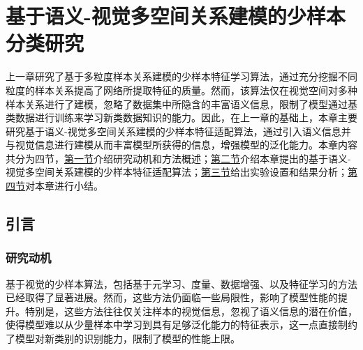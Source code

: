 \chapter[\hspace{0pt}基于语义-视觉多空间关系建模的少样本分类研究]{{\heiti{}\hspace{0pt}基于语义-视觉多空间关系建模的少样本分类研究}}\label{chapter4: 基于语义-视觉多空间关系建模的少样本分类研究}
\removelofgap
\removelotgap

上一章研究了基于多粒度样本关系建模的少样本特征学习算法，通过充分挖掘不同粒度的样本关系提高了网络所提取特征的质量。然而，该算法仅在视觉空间对多种样本关系进行了建模，忽略了数据集中所隐含的丰富语义信息，限制了模型通过基类数据进行训练来学习新类数据知识的能力。因此，在上一章的基础上，本章主要研究基于语义-视觉多空间关系建模的少样本特征适配算法，通过引入语义信息并与视觉信息进行建模从而丰富模型所获得的信息，增强模型的泛化能力。本章内容共分为四节，\hyperref[section4: 引言]{第一节}介绍研究动机和方法概述；\hyperref[section4: 基于语义-视觉多空间关系建模的少样本特征适配算法]{第二节}介绍本章提出的基于语义-视觉多空间关系建模的少样本特征适配算法；\hyperref[section4: 实验设置及结果分析]{第三节}给出实验设置和结果分析；\hyperref[section4: 本章小结]{第四节}对本章进行小结。

\section[\hspace{-2pt}引言]{{\heiti{} \hspace{-8pt}引言}}\label{section4: 引言}

\subsection[\hspace{-2pt}研究动机]{{\heiti{} \hspace{-8pt}研究动机}}\label{section4: 研究动机}

基于视觉的少样本算法，包括基于元学习、度量、数据增强、以及特征学习的方法已经取得了显著进展。然而，这些方法仍面临一些局限性，影响了模型性能的提升。特别是，这些方法往往仅关注样本的视觉信息，忽视了语义信息的潜在价值，使得模型难以从少量样本中学习到具有足够泛化能力的特征表示，这一点直接制约了模型对新类别的识别能力，限制了模型的性能上限。

